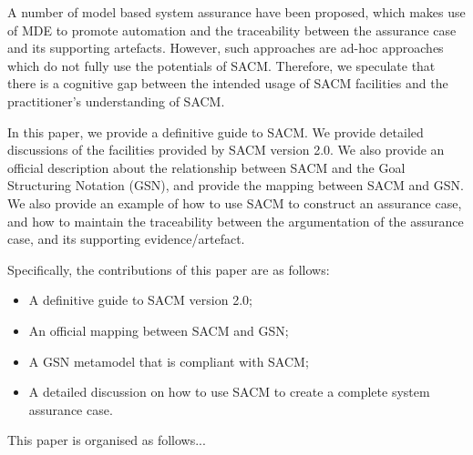 A number of model based system assurance have been proposed, which makes use of MDE to promote automation and the traceability between the assurance case and its supporting artefacts. However, such approaches are ad-hoc approaches which do not fully use the potentials of SACM. Therefore, we speculate that there is a cognitive gap between the intended usage of SACM facilities and the practitioner's understanding of SACM. 

In this paper, we provide a definitive guide to SACM. We provide detailed discussions of the facilities provided by SACM version 2.0. We also provide an official description about the relationship between SACM and the Goal Structuring Notation (GSN), and provide the mapping between SACM and GSN. We also provide an example of how to use SACM to construct an assurance case, and how to maintain the traceability between the argumentation of the assurance case, and its supporting evidence/artefact.

Specifically, the contributions of this paper are as follows:
\begin{itemize}
	\item A definitive guide to SACM version 2.0;
	\item An official mapping between SACM and GSN;
	\item A GSN metamodel that is compliant with SACM;
	\item A detailed discussion on how to use SACM to create a complete system assurance case.
\end{itemize}

This paper is organised as follows...




